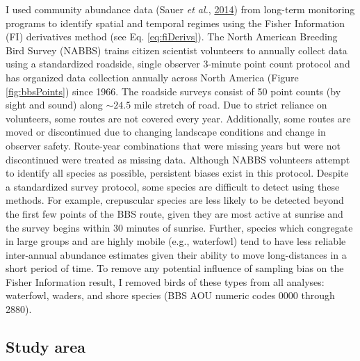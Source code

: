 \documentclass[12pt,twoside,openany]{reedthesis}
\begin{document}
I used community abundance data (Sauer \emph{et al.}, \protect\hyperlink{ref-sauer2017results}{2014}) from long-term monitoring programs to identify spatial and temporal regimes using the Fisher Information (FI) derivatives method (see Eq. \eqref{eq:fiDerivs}). The North American Breeding Bird Survey (NABBS) trains citizen scientist volunteers to annually collect data using a standardized roadside, single observer 3-minute point count protocol and has organized data collection annually across North America (Figure \ref{fig:bbsPoints}) since 1966. The roadside surveys consist of 50 point counts (by sight and sound) along \(\sim24.5\) mile stretch of road. Due to strict reliance on volunteers, some routes are not covered every year. Additionally, some routes are moved or discontinued due to changing landscape conditions and change in observer safety. Route-year combinations that were missing years but were not discontinued were treated as missing data. Although NABBS volunteers attempt to identify all species as possible, persistent biases exist in this protocol. Despite a standardized survey protocol, some species are difficult to detect using these methods. For example, crepuscular species are less likely to be detected beyond the first few points of the BBS route, given they are most active at sunrise and the survey begins within 30 minutes of sunrise. Further, species which congregate in large groups and are highly mobile (e.g., waterfowl) tend to have less reliable inter-annual abundance estimates given their ability to move long-distances in a short period of time. To remove any potential influence of sampling bias on the Fisher Information result, I removed birds of these types from all analyses: waterfowl, waders, and shore species (BBS AOU numeric codes 0000 through 2880).

\hypertarget{study-area}{%
\subsection{Study area}\label{study-area}}
\end{document}
